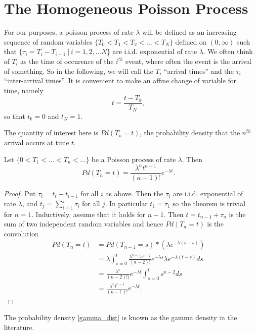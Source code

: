 \documentclass[12pt,leqno]{article}
\begin{document}
\section{The Homogeneous Poisson Process}
For our purposes, a poisson process of rate $\lambda$ will be defined as an increasing sequence of random variables
$ \{T_0 < T_1 < T_2 < \dots < T_N\}$ defined on $(0,\infty)$ such that $\{\tau_i = T_i-T_{i-1}~|~ i = 1,2,\dots N\}$ are i.i.d.
exponential of rate $\lambda$. We often think of $T_i$ as the time of occurence of the $i^{th}$
event, where often the event is the arrival of something.  So in the following, we will call the $T_i$
``arrival times'' and the $\tau_i$ ``inter-arrival times''.  
It is convenient to make an affine change of variable for time,
namely
$$
t = \frac{t-T_0}{T_N},
$$
so that $t_0 = 0$ and $t_N = 1$.

The quantity of interest here is $Pd(T_n = t)$, the probability density that the $n^{th}$ arrival occurs at time $t$.
\begin{Thm}
  Let $\{0 < T_1<\dots<T_n<... \}$ be a Poisson process of rate $\lambda$.  Then
  \begin{equation}\label{gamma_dist}
  Pd(T_n = t) = \frac{\lambda^nt^{n-1}}{(n-1)!}e^{-\lambda{t}}.
  \end{equation}
  \begin{proof}
    Put $\tau_i = t_i - t_{i-1}$ for all $i$ as above. Then the $\tau_i$ are i.i.d. exponential of rate $\lambda$, and
    $t_j = \sum_{i=1}^j \tau_i$ for all $j$.  In particular $t_1 = \tau_1$ so the theorem is trivial for $n = 1$.
    Inductively, assume that it holds for $n-1$. Then $t = t_{n-1} + \tau_n$ is the sum of two independent random
    variables and hence $Pd(T_n = t)$ is the convolution
    \begin{align*}
      Pd(T_n = t) &= Pd(T_{n-1} = s)*({\lambda}e^{-\lambda(t-s)})\\
      &= \lambda\int_{s=0}^t\frac{\lambda^{n-1}s^{n-2}}{(n-2)!}e^{-\lambda{s}}{\lambda}e^{-\lambda(t-s)}ds \\
      &= \frac{\lambda^n}{(n-2)!)}e^{-\lambda{t}}\int_{s=0}^ts^{n-2}ds \\
      &= \frac{\lambda^nt^{n-1}}{(n-1)!}e^{-\lambda{t}}.
    \end{align*}
  \end{proof}
\end{Thm}
The probability density \eqref{gamma_dist} is known as the gamma density in the literature.
\end{document}

